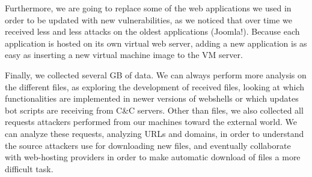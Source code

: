Furthermore, we are going to replace some of the web applications we used in order to be updated with new vulnerabilities, as we noticed that over time we received less and less attacks on the oldest applications (Joomla!). Because each application is hosted on its own virtual web server, adding a new application is as easy as inserting a new virtual machine image to the VM server.

Finally, we collected several GB of data. We can always perform more analysis on the different files, as exploring the development of received files, looking at which functionalities are implemented in newer versions of webshells or which updates bot scripts are receiving from C\&C servers. Other than files, we also collected all requests attackers performed from our machines toward the external world. We can analyze these requests, analyzing URLs and domains, in order to understand the source attackers use for downloading new files, and eventually collaborate with web-hosting providers in order to make automatic download of files a more difficult task.
